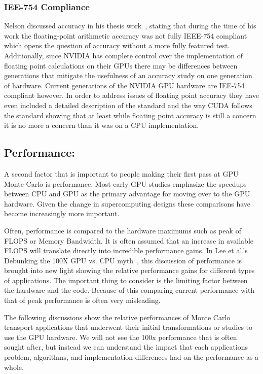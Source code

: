 \subsubsection*{ \textbf{IEE-754 Compliance} }
Nelson discussed accuracy in his thesis work~\cite{nelson2009monte}, stating that during the time of his work the floating-point arithmetic accuracy was not fully IEEE-754 compliant which opens the question of accuracy without a more fully featured test. 
%
Additionally, since NVIDIA has complete control over the implementation of floating point calculations on their GPUs there may be differences between generations that mitigate the usefulness of an accuracy study on one generation of hardware.
%
Current generations of the NVIDIA GPU hardware are IEE-754 compliant however. 
%
In order to address issues of floating point accuracy they have even included a detailed description of the standard and the way CUDA follows the standard showing that at least while floating point accuracy is still a concern it is no more a concern than it was on a CPU implementation.~\cite{cudaToolkitv7.5}
%

\subsection*{\textbf{Performance:}}

A second factor that is important to people making their first pass at GPU Monte Carlo is performance.
%
Most early GPU studies emphasize the speedups between CPU and GPU as the primary advantage for moving over to the GPU hardware.
%
Given the change in supercomputing designs these comparisons have become increasingly more important.
%

%
Often, performance is compared to the hardware maximums such as peak of FLOPS or Memory Bandwidth.
%
It is often assumed that an increase in available FLOPS will translate directly into incredible performance gains.
%
In Lee et al.'s Debunking the 100X GPU vs. CPU myth~\cite{lee2010debunking}, this discussion of performance is brought into new light showing the relative performance gains for different types of applications.
%
The important thing to consider is the limiting factor between the hardware and the code.
%
Because of this comparing current performance with that of peak performance is often very misleading.
%

%
The following discussions show the relative performances of Monte Carlo transport applications that underwent their initial transformations or studies to use the GPU hardware.
%
We will not see the 100x performance that is often sought after, but instead we can understand the impact that each applications problem, algorithms, and implementation differences had on the performance as a whole.
%

